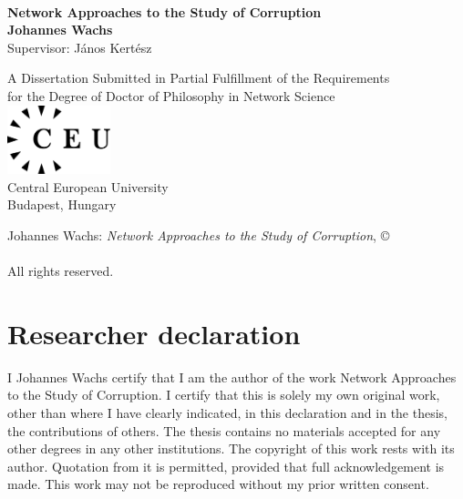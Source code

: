 \documentclass[a4paper,twoside,12pt]{book}
\begin{document}
\begin{titlepage}

\begin{center}

\mbox{}\\[4cm]

\textbf{\Large{Network Approaches to the Study of Corruption}}\\[0.8cm]

{\large{\textbf{Johannes Wachs}}}\\[5cm]

Supervisor: J\'anos Kert\'esz

\medskip

A Dissertation Submitted in Partial Fulfillment of the Requirements\\ for the Degree of Doctor of Philosophy in Network Science\\[2cm]

\includegraphics[width=3cm,height=2cm]{images/ceulogo.eps}\\[0.5cm]

Central European University\\
Budapest, Hungary

\vfill
 
\the\year
\end{center}

\end{titlepage}

\newpage

\pagestyle{empty}

\mbox{}

\vfill

\noindent Johannes Wachs: \emph{Network Approaches to the Study of Corruption}, \copyright \\
\the\year \\ All rights reserved.



\mbox{}

\pagestyle{empty}

\newpage


\chapter*{Researcher declaration}
I Johannes Wachs certify that I am the author of the work Network Approaches to the Study of Corruption. I certify that this is solely my own original work, other than where I have clearly indicated, in this declaration and in the thesis, the contributions of others. The thesis contains no materials accepted for any other degrees in any other institutions.  The copyright of this work rests with its author. Quotation from it is permitted, provided that full acknowledgement is made. This work may not be reproduced without my prior written consent. 
\end{document}
